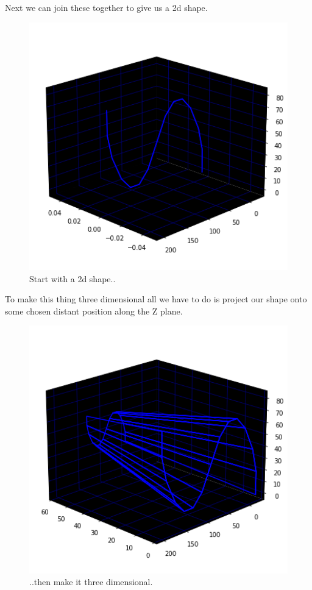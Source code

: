 Next we can join these together to give us a 2d shape.
\begin{figure}[H]
    \centering
    \begin{adjustbox}{width=8cm,center}
      \includegraphics[width=12cm]{src/webs/sine_wave_2d_no_title.png}%
    \end{adjustbox}
  \caption{Start with a 2d shape..}
\end{figure}

To make this thing three dimensional all we have to do is project our shape onto
some chosen distant position along the Z plane.
\vspace{-0.5cm}
\begin{figure}[H]
    \centering
    \begin{adjustbox}{width=8cm,center}
      \includegraphics[width=12cm]{src/webs/sine_wave_no_title.png}%
    \end{adjustbox}
  \caption{..then make it three dimensional.}
\end{figure}

